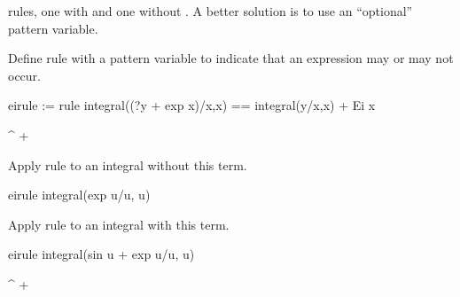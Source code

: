 {rules, one with and one without .
A better solution is to use an ``optional'' pattern variable.
%
\begin{xtc}
\begin{xtccomment}
Define rule  with
a pattern variable  to indicate
that an expression may or may not occur.
\end{xtccomment}
\begin{spadsrc}
eirule := rule integral((?y + exp x)/x,x) == integral(y/x,x) + Ei x 
\end{spadsrc}
\begin{TeXOutput}
\begin{fricasmath}{17}
\int^{} \TIMES {}\SYMBOL{\ ==\ }%
+%
\end{fricasmath}
\end{TeXOutput}
\end{xtc}
\begin{xtc}
\begin{xtccomment}
Apply rule  to an integral without this term.
\end{xtccomment}
\begin{spadsrc}
eirule integral(exp u/u, u) 
\end{spadsrc}
\begin{TeXOutput}
\begin{fricasmath}{18}
%
\end{fricasmath}
\end{TeXOutput}
\end{xtc}
\begin{xtc}
\begin{xtccomment}
Apply rule  to an integral with this term.
\end{xtccomment}
\begin{spadsrc}
eirule integral(sin u + exp u/u, u) 
\end{spadsrc}
\begin{TeXOutput}
\begin{fricasmath}{19}
\int^{} \TIMES {}+%
%
\end{fricasmath}
\end{TeXOutput}
\end{xtc}

}
